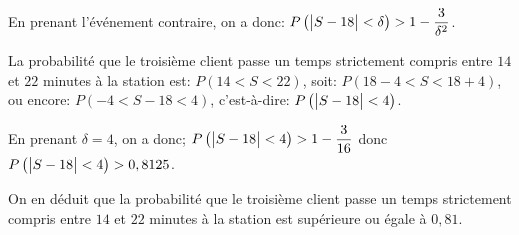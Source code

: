 \documentclass[10pt]{article}
\begin{document}
\begin{enumerate}
En prenant l'événement contraire, on a donc:
$P\left ( \left |S-18\strut \right | < \delta \right ) > 1- \dfrac{3}{\delta^2}$.

La probabilité que le troisième client passe un temps strictement compris entre $14$ et $22$ minutes à la station est:
$P(14<S<22)$, soit: $P(18-4<S<18+4)$, ou encore: $P(-4<S-18<4)$, c'est-à-dire:
$P\left ( \left | S-18 \strut \right | <4\right )$.

En prenant $\delta=4$, on a donc;
$P\left ( \left |S-18\strut \right | < 4 \right ) >1- \dfrac{3}{16}$
donc $P\left ( \left |S-18\strut \right | < 4 \right ) > 0,8125$.

On en déduit que la probabilité que le troisième client passe un temps strictement compris entre $14$ et $22$ minutes à la station est supérieure ou égale à $0,81$.
\end{enumerate}

\bigskip
\end{document}

